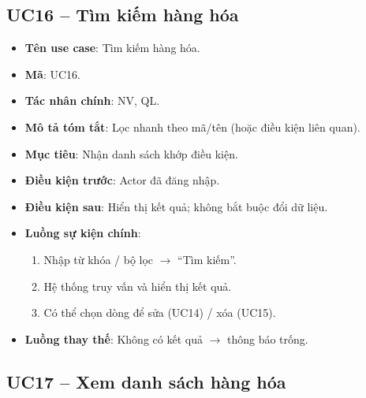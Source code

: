 \subsection{UC16 -- Tìm kiếm hàng hóa}

\begin{itemize}[leftmargin=1.5cm]
    \item \textbf{Tên use case}: Tìm kiếm hàng hóa.
    \item \textbf{Mã}: UC16.
    \item \textbf{Tác nhân chính}: NV, QL.
    \item \textbf{Mô tả tóm tắt}: Lọc nhanh theo mã/tên (hoặc điều kiện liên quan).
    \item \textbf{Mục tiêu}: Nhận danh sách khớp điều kiện.
    \item \textbf{Điều kiện trước}: Actor đã đăng nhập.
    \item \textbf{Điều kiện sau}: Hiển thị kết quả; không bắt buộc đổi dữ liệu.
    \item \textbf{Luồng sự kiện chính}:
    \begin{enumerate}
        \item Nhập từ khóa / bộ lọc $\rightarrow$ ``Tìm kiếm''.
        \item Hệ thống truy vấn và hiển thị kết quả.
        \item Có thể chọn dòng để sửa (UC14) / xóa (UC15).
    \end{enumerate}
    \item \textbf{Luồng thay thế}: Không có kết quả $\rightarrow$ thông báo trống.
\end{itemize}


\subsection{UC17 -- Xem danh sách hàng hóa}


